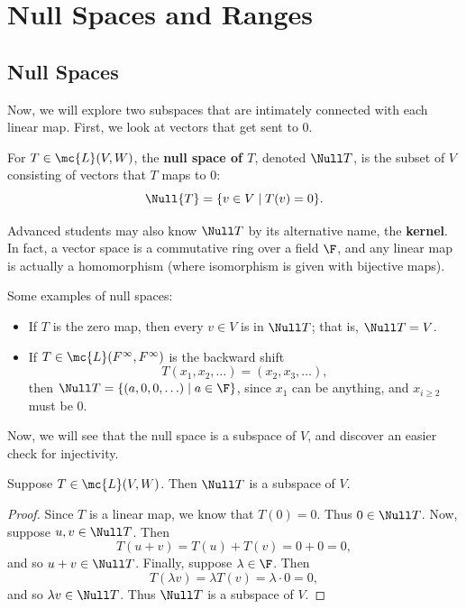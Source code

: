 \documentclass[math0540-lecture-notes.tex]{subfiles}
\begin{document}
\section{Null Spaces and Ranges}

\subsection{Null Spaces}

Now, we will explore two subspaces that are intimately connected with each linear map. First, we
look at vectors that get sent to $0$.
\begin{definition}{}
  For $T\in \mc{L}(V,W)$, the \textbf{null space of $T$}, denoted $\Null T$, is the subset of $V$ 
  consisting of vectors that $T$ maps to $0$:
  \[
    \Null{T}= \{v\in V\mid T(v)=0\} 
  .\] 
\end{definition}

\begin{remark}
  Advanced students may also know $ \Null T$ by its alternative name, the \textbf{kernel}. In fact,
  a vector space is a commutative ring over a field $\F$, and any linear map is actually a
  homomorphism (where isomorphism is given with bijective maps).
\end{remark}


\begin{example}
  Some examples of null spaces:
  \begin{itemize}
    \item If $T$ is the zero map, then every $v\in V$ is in $\Null T$; that is, $\Null T =
      V$.
    \item If $T\in \mc{L}(F^{\infty},F^{\infty})$ is the backward shift \[
        T(x_1,x_2,\ldots)=(x_2,x_3,\ldots)
      ,\] then $\Null T = \{(a,0,0,\ldots)\mid a\in \F\}$, since $ x_1$ can be anything, and
      $x_{i\ge 2}$ must be $0$.
  \end{itemize}
\end{example}

Now, we will see that the null space is a subspace of $V$, and discover an easier check for
injectivity.
\begin{proposition}{}
  Suppose $T\in \mc{L}(V,W)$. Then $ \Null T$ is a subspace of $V$.
\end{proposition}
\begin{proof}[Proof]
  Since $T$ is a linear map, we know that $T(0)=0$. Thus $0\in \Null T$. Now, suppose $u,v\in \Null
  T$. Then \[
    T(u+v)=T(u)+T(v)=0+0=0
  ,\] and so $u+v\in \Null T$. Finally, suppose $\lambda\in \F$. Then \[
    T(\lambda v)=\lambda T(v) = \lambda\cdot 0=0
  ,\] and so $ \lambda v\in \Null T$. Thus $ \Null T$ is a subspace of $V$.
\end{proof}
\end{document}
